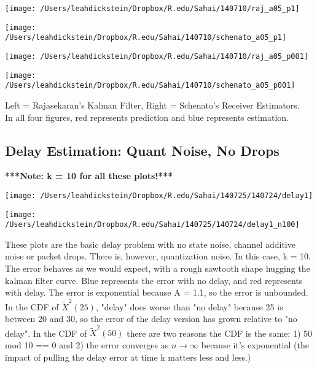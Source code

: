 \documentclass[leqno,twocolumn]{article}
\begin{document}
\begin{minipage}[c]{0.5\textwidth}
\texttt{[image: /Users/leahdickstein/Dropbox/R.edu/Sahai/140710/raj\_a05\_p1]}
\end{minipage}
\begin{minipage}[c]{0.5\textwidth}
\texttt{[image: /Users/leahdickstein/Dropbox/R.edu/Sahai/140710/schenato\_a05\_p1]}
\end{minipage}

\begin{minipage}[c]{0.5\textwidth}
\texttt{[image: /Users/leahdickstein/Dropbox/R.edu/Sahai/140710/raj\_a05\_p001]}
\end{minipage}
\begin{minipage}[c]{0.5\textwidth}
\texttt{[image: /Users/leahdickstein/Dropbox/R.edu/Sahai/140710/schenato\_a05\_p001]}
\end{minipage}

Left = Rajasekaran's Kalman Filter, Right = Schenato's Receiver Estimators.\\
In all four figures, red represents prediction and blue represents estimation. 

\subsection{Delay Estimation: Quant Noise, No Drops}
\textbf{***Note: k = 10 for all these plots!***}\\

\begin{minipage}[c]{0.5\textwidth}
\texttt{[image: /Users/leahdickstein/Dropbox/R.edu/Sahai/140725/140724/delay1]}
\end{minipage}
\begin{minipage}[c]{0.5\textwidth}
\texttt{[image: /Users/leahdickstein/Dropbox/R.edu/Sahai/140725/140724/delay1\_n100]}
\end{minipage}

These plots are the basic delay problem with no state noise, channel additive noise or packet drops. There is, however, quantization noise. In this case, k = 10. The error behaves as we would expect, with a rough sawtooth shape hugging the kalman filter curve. Blue represents the error with no delay, and red represents with delay. The error is exponential because A = 1.1, so the error is unbounded. In the CDF of $\tilde{X}^2(25)$, "delay" does worse than "no delay" because 25 is between 20 and 30, so the error of the delay version has grown relative to "no delay". In the CDF of $\tilde{X}^2(50)$ there are two reasons the CDF is the same: 1) 50 mod 10 == 0 and 2) the error converges as $n \rightarrow \infty$ because it's exponential (the impact of pulling the delay error at time k matters less and less.)
\end{document}
